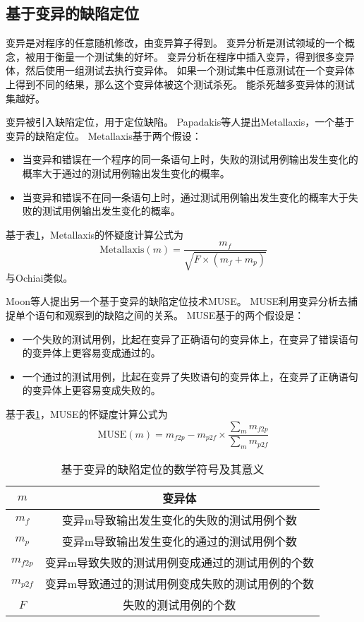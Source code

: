 \subsection{基于变异的缺陷定位}

变异是对程序的任意随机修改，由变异算子得到。
变异分析是测试领域的一个概念，被用于衡量一个测试集的好坏。
变异分析在程序中插入变异，得到很多变异体，然后使用一组测试去执行变异体。
如果一个测试集中任意测试在一个变异体上得到不同的结果，那么这个变异体被这个测试杀死。
能杀死越多变异体的测试集越好。

变异被引入缺陷定位，用于定位缺陷。
Papadakis等人提出Metallaxis\parencite{Papadakis2015Metallaxis}，一个基于变异的缺陷定位。
Metallaxis基于两个假设：
\begin{itemize}
\item 当变异和错误在一个程序的同一条语句上时，失败的测试用例输出发生变化的概率大于通过的测试用例输出发生变化的概率。
\item 当变异和错误不在同一条语句上时，通过测试用例输出发生变化的概率大于失败的测试用例输出发生变化的概率。
\end{itemize}
基于表\ref{mutant_symbol}，Metallaxis的怀疑度计算公式为
$$
\mathrm{Metallaxis}(m) = \frac{m_f}{\sqrt{F \times (m_f + m_p)}}
$$
与Ochiai类似。

Moon等人提出另一个基于变异的缺陷定位技术MUSE\parencite{Moon2014Ask}。
MUSE利用变异分析去捕捉单个语句和观察到的缺陷之间的关系。
MUSE基于的两个假设是：
\begin{itemize}
\item 一个失败的测试用例，比起在变异了正确语句的变异体上，在变异了错误语句的变异体上更容易变成通过的。
\item 一个通过的测试用例，比起在变异了失败语句的变异体上，在变异了正确语句的变异体上更容易变成失败的。
\end{itemize}
基于表\ref{mutant_symbol}，MUSE的怀疑度计算公式为
$$
\mathrm{MUSE}(m) = m_{f2p} - m_{p2f} \times \frac{\sum_{m}^{}{m_{f2p}}}{\sum_{m}^{}{m_{p2f}}}
$$

\begin{table}
\centering
\begin{tabular}{|c|c|}
\hline
$m$ & 变异体 \\
\hline
$m_f$ & 变异m导致输出发生变化的失败的测试用例个数 \\
\hline
$m_p$ & 变异m导致输出发生变化的通过的测试用例个数 \\
\hline
$m_{f2p}$ & 变异m导致失败的测试用例变成通过的测试用例的个数 \\
\hline
$m_{p2f}$ & 变异m导致通过的测试用例变成失败的测试用例的个数 \\
\hline
$F$ & 失败的测试用例的个数 \\
\hline
\end{tabular}
\caption{基于变异的缺陷定位的数学符号及其意义}
\label{mutant_symbol}
\end{table}

